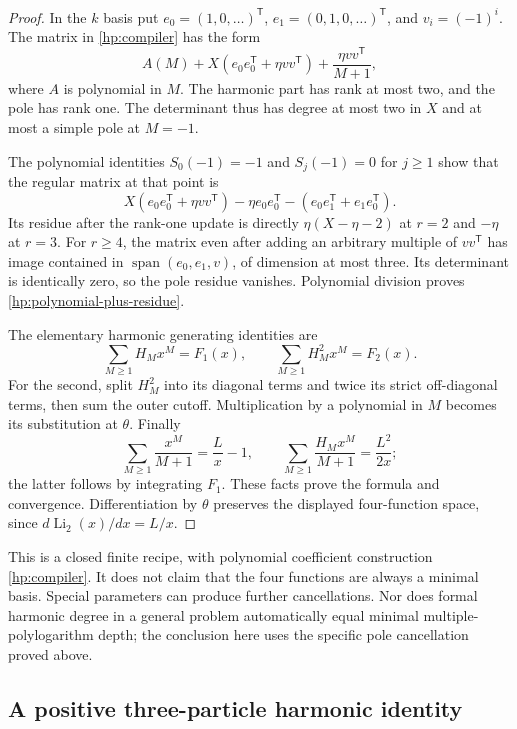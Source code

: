 \documentclass[11pt,a4paper]{article}
\theoremstyle{definition}
\theoremstyle{remark}
\numberwithin{equation}{section}
\begin{document}
\begin{proof}
In the $k$ basis put $e_0=(1,0,\ldots)^{\mathsf T}$,
$e_1=(0,1,0,\ldots)^{\mathsf T}$, and
$v_i=(-1)^i$. The matrix in \eqref{hp:compiler} has the form
\[
 A(M)+X(e_0e_0^{\mathsf T}+\eta vv^{\mathsf T})
                       +\frac{\eta vv^{\mathsf T}}{M+1},
\]
where $A$ is polynomial in $M$. The harmonic part has rank at
most two, and the pole has rank one. The determinant thus has
degree at most two in $X$ and at most a simple pole at $M=-1$.

The polynomial identities $S_0(-1)=-1$ and $S_j(-1)=0$ for
$j\ge1$ show that the regular matrix at that point is
\[
 X(e_0e_0^{\mathsf T}+\eta vv^{\mathsf T})
              -\eta e_0e_0^{\mathsf T}
              -(e_0e_1^{\mathsf T}+e_1e_0^{\mathsf T}).
\]
Its residue after the rank-one update is directly
$\eta(X-\eta-2)$ at $r=2$ and $-\eta$ at $r=3$.
For $r\ge4$, the matrix even after adding an arbitrary multiple
of $vv^{\mathsf T}$ has image contained in
$\operatorname{span}(e_0,e_1,v)$, of dimension at most three.
Its determinant is identically zero, so the pole residue
vanishes. Polynomial division proves
\eqref{hp:polynomial-plus-residue}.

The elementary harmonic generating identities are
\[
 \sum_{M\ge1}H_Mx^M=F_1(x),\qquad
 \sum_{M\ge1}H_M^2x^M=F_2(x).
\]
For the second, split $H_M^2$ into its diagonal terms and twice
its strict off-diagonal terms, then sum the outer cutoff.
Multiplication by a polynomial in $M$ becomes its substitution
at $\theta$. Finally
\[
 \sum_{M\ge1}\frac{x^M}{M+1}=\frac Lx-1,\qquad
 \sum_{M\ge1}\frac{H_Mx^M}{M+1}=\frac{L^2}{2x};
\]
the latter follows by integrating $F_1$. These facts prove the
formula and convergence. Differentiation by $\theta$ preserves
the displayed four-function space, since
$d\operatorname{Li}_2(x)/dx=L/x$.
\end{proof}

This is a closed finite recipe, with polynomial coefficient
construction \eqref{hp:compiler}. It does not claim that the
four functions are always a minimal basis. Special parameters
can produce further cancellations. Nor does formal harmonic
degree in a general problem automatically equal minimal
multiple-polylogarithm depth; the conclusion here uses the
specific pole cancellation proved above.

\subsection{A positive three-particle harmonic identity}
\end{document}
